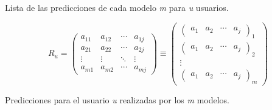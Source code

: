 \begin{center}
    Lista de las predicciones de cada modelo \textit{m} para \textit{u} usuarios.
\end{center}

\[  
    \textit{R$_{u}$} =
        \begin{pmatrix}
            a_{11}  &  a_{12}  &  \cdots   & a_{1j} \\ 
            a_{21}  &  a_{22}  &  \cdots   & a_{2j}\\ 
            \vdots  &  \vdots  &  \ddots & \vdots  \\ 
            a_{m1}  &  a_{m2}  &  \cdots   & a_{mj}
        \end{pmatrix}
        \equiv
        \begin{pmatrix}
            \begin{pmatrix} a_{1}  &  a_{2}  &  \cdots   & a_{j} \end{pmatrix}_{1} \\ 
            \begin{pmatrix} a_{1}  &  a_{2}  &  \cdots   & a_{j} \end{pmatrix}_{2} \\ 
            \vdots \\ 
            \begin{pmatrix} a_{1}  &  a_{2}  &  \cdots   & a_{j} \end{pmatrix}_{m}
        \end{pmatrix}
\]
\begin{center}
    Predicciones para el usuario \textit{u} realizadas por los \textit{m} modelos.
\end{center}

